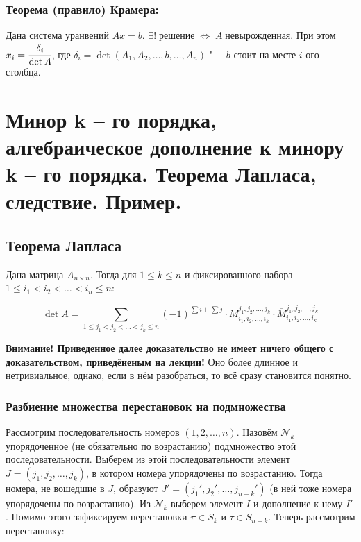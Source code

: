 \documentclass{article}
\begin{document}
\subsubsection{Теорема (правило) Крамера:}
Дана система уранвений $Ax = b$. 
$\exists ! \;\text{решение} \;\Leftrightarrow\; A\;\text{невырожденная}$.
При  этом $x_i = \cfrac{\delta_i}{\operatorname{det}A}$, где $\delta_i = \operatorname{det}(A_1, A_2, \ldots, b, \ldots, A_n)$ "--- $b$ стоит на месте $i$-ого столбца.

\newpage
\section{Минор k – го порядка, алгебраическое дополнение к минору k – го порядка. Теорема Лапласа, следствие. Пример.}

\subsection{Теорема Лапласа}

Дана матрица $A_{n\times n}$. Тогда для $1 \leq k \leq n$ и фиксированного набора $1 \leq i_1 < i_2 <\ldots < i_n \leq n$: 

$$\operatorname{det}A = \sum_{1 \leq j_1 < j_2 <\ldots < j_k \leq n} (-1)^{\sum i + \sum j}\cdot M^{j_1, j_2, \ldots, j_k}_{i_1, i_2, \ldots, i_k} \cdot \overline{M}^{j_1, j_2, \ldots, j_k}_{i_1, i_2, \ldots, i_k}$$

\textbf{Внимание! Приведенное далее доказательство не имеет ничего общего с доказательством, приведёненым на лекции!}
Оно более длинное и нетривиальное, однако, если в нём разобраться, то всё сразу становится понятно. 

\subsubsection{Разбиение множества перестановок на подмножества}
Рассмотрим последовательность номеров $(1, 2, \ldots, n)$. Назовём $\mathcal{N}_k$ упорядоченное (не обязательно по возрастанию) подмножество этой последовательности. Выберем из этой последовательности элемент $J = (j_1, j_2, \ldots, j_k)$, в котором номера упорядочены по возрастанию. Тогда номера, не вошедшие в $J$, образуют $J' = (j_1', j_2', \ldots, j_{n-k}')$ (в ней тоже номера упорядочены по возрастанию). Из $\mathcal{N}_k$ выберем элемент $I$ и дополнение к нему $I'$. Помимо этого зафиксируем перестановки $\pi \in S_k$ и $\tau \in S_{n - k}$. Теперь рассмотрим перестановку:
\end{document}
